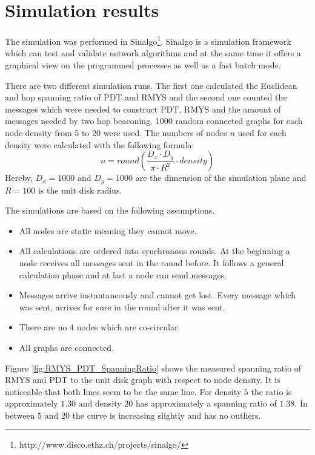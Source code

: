 \section{Simulation results}
The simulation was performed in Sinalgo\footnote{http://www.disco.ethz.ch/projects/sinalgo/}.
Sinalgo is a simulation framework which can test and validate network algorithms and at the same time it offers a graphical view on the programmed processes as well as a fast batch mode.

There are two different simulation runs.
The first one calculated the Euclidean and hop spanning ratio of PDT and RMYS and the second one counted the messages which were needed to construct PDT, RMYS and the amount of messages needed by two hop beaconing.
1000 random connected graphs for each node density from 5 to 20 were used.
The numbers of nodes $n $ used for each density were calculated with the following formula:
\begin{equation*}
n =round( \frac{D_x \cdot D_y}{\pi \cdot R^2} \cdot density)
\end{equation*}
Hereby, $D_x=1000 $ and $D_y=1000 $ are the dimension of the simulation plane and $R = 100 $ is the unit disk radius.

\bigskip

The simulations are based on the following assumptions.
\begin{itemize}
\item All nodes are static meaning they cannot move.
\item All calculations are ordered into synchronous rounds. 
At the beginning a node receives all messages sent in the round before.
It follows a general calculation phase and at last a node can send messages.
\item Messages arrive instantaneously and cannot get lost.
Every message which was sent, arrives for sure in the round after it was sent.
\item There are no 4 nodes which are co-circular.
\item All graphs are connected.
\end{itemize}

Figure \ref{fig:RMYS_PDT_SpanningRatio} shows the measured spanning ratio of RMYS and PDT to the unit disk graph with respect to node density.
It is noticeable that both lines seem to be the same line.
For density $5 $ the ratio is approximately $1.30 $ and density 20 has approximately a spanning ratio of $1.38 $.
In between 5 and 20 the curve is increasing slightly and has no outliers.

